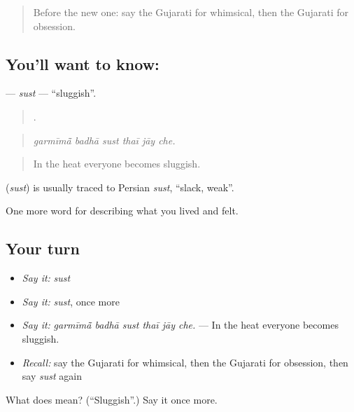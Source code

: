 \label{lesson:GU-C469-sust}



\begin{quote}
Before the new one: say the Gujarati for whimsical, then the Gujarati for obsession.
\end{quote}

\subsection*{You'll want to know: }
\textbf{} — \emph{sust} — \textquotedblleft{}sluggish\textquotedblright{}.

\begin{quote}
     .
\end{quote}

\begin{quote}
\emph{garmīmā̃ badhā sust thaī jāy che.}
\end{quote}

\begin{quote}
In the heat everyone becomes sluggish.
\end{quote}

\begin{cousinweb}
\textbf{} (\emph{sust}) is usually traced to Persian \emph{sust}, \textquotedblleft{}slack, weak\textquotedblright{}.
\end{cousinweb}

\begin{grammarlens}[title={What you've built}]
One more word for describing what you lived and felt.
\end{grammarlens}

\subsection*{Your turn}
\begin{itemize}
\raggedright
  \item \emph{Say it:} \emph{sust}
  \item \emph{Say it:} \emph{sust}, once more
  \item \emph{Say it:} \emph{garmīmā̃ badhā sust thaī jāy che.} — In the heat everyone becomes sluggish.
  \item \emph{Recall:} say the Gujarati for whimsical, then the Gujarati for obsession, then say \emph{sust} again
\end{itemize}

\begin{tcolorbox}[breakable,colback=teal!4,colframe=teal!35!black,title={Before you move on}]
What does  mean? (\textquotedblleft{}Sluggish\textquotedblright{}.) Say it once more.
\end{tcolorbox}
